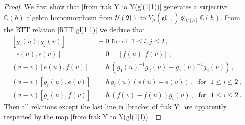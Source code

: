 \documentclass[10pt]{amsart}
\theoremstyle{definition}
\numberwithin{equation}{section}
\newcommand{\bC}{\mathbb{C}}
\begin{document}
\begin{proof}
We first show that \eqref{from frak Y to Y(gl(1|1))} generates a surjective $\bC(\hbar)$ algebra homomorphism from $\mathcal U(\mathfrak{Y})$ to $Y_\mu(\mathfrak{gl}_{1|1})\otimes_{\bC[\hbar]}\bC(\hbar)$. From the RTT relation \eqref{RTT gl(1|1)} we deduce that
\begin{equation}\label{rel in Y(gl(1|1))}
\begin{split}
[g_i(u),g_j(v)]&=0\text{ for all }1\leqslant i,j\leqslant 2\,,\\
[e(u),e(v)]&=0=[f(u),f(v)]\,,\\
(u-v)[e(u),f(v)]&=\hbar\,(g_1(u)^{-1}g_2(u)-g_1(v)^{-1}g_2(v))\,,\\
(u-v)[g_i(u),e(v)]&=\hbar\, g_i(u)(e(u)-e(v))\,,\;\text{ for }\; 1\leqslant i\leqslant 2\,,\\
(u-v)[g_i(u),f(v)]&=\hbar\, (f(v)-f(u))g_i(u)\,,\;\text{ for }\; 1\leqslant i\leqslant 2\,.
\end{split}
\end{equation}
Then all relations except the last line in \eqref{bracket of frak Y} are apparently respected by the map \eqref{from frak Y to Y(gl(1|1))}. 


\end{proof}
\end{document}
